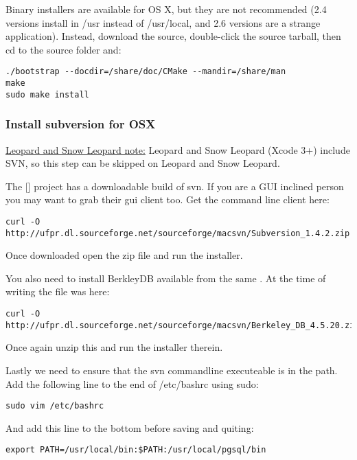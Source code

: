 Binary installers are available for OS X, but they are not recommended
(2.4 versions install in /usr instead of /usr/local, and 2.6 versions are a
strange application). Instead, download the source, double-click the source tarball,
then cd to the source folder and:

\begin{verbatim}
./bootstrap --docdir=/share/doc/CMake --mandir=/share/man
make
sudo make install
\end{verbatim}

\subsubsection{Install subversion for OSX}
\underline{Leopard and Snow Leopard note:} Leopard and Snow Leopard (Xcode 3+)
include SVN, so this step can be skipped on Leopard and Snow Leopard.

The [] project has a downloadable
build of svn. If you are a GUI inclined person you may want to grab their gui
client too. Get the command line client here:

\begin{verbatim}
curl -O http://ufpr.dl.sourceforge.net/sourceforge/macsvn/Subversion_1.4.2.zip 
\end{verbatim}

Once downloaded open the zip file and run the installer.

You also need to install BerkleyDB available from the same
. At the time of writing the
file was here:

\begin{verbatim}
curl -O http://ufpr.dl.sourceforge.net/sourceforge/macsvn/Berkeley_DB_4.5.20.zip 
\end{verbatim}

Once again unzip this and run the installer therein.

Lastly we need to ensure that the svn commandline executeable is in the path.
Add the following line to the end of /etc/bashrc using sudo:

\begin{verbatim}
sudo vim /etc/bashrc 
\end{verbatim}

And add this line to the bottom before saving and quiting:

\begin{verbatim}
export PATH=/usr/local/bin:$PATH:/usr/local/pgsql/bin 
\end{verbatim}

